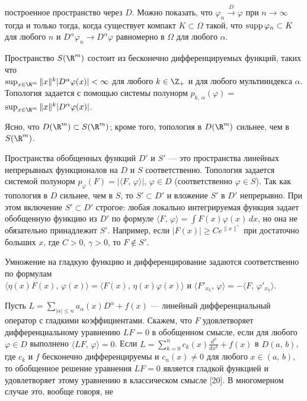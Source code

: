 \documentclass[a4paper
]{article}
\begin{document}
построенное пространство через $D$. Можно показать, что
$\varphi_n\stackrel{D}{\rightarrow}\varphi$ при $n \rightarrow \infty$
тогда и только тогда, когда существует компакт $K\subset \Omega$
такой, что ${\rm supp}\, \varphi_n\subset K$ для любого $n$ и
$D^\alpha \varphi_n\rightarrow D^\alpha\varphi$ равномерно в
$\Omega$ для любого $\alpha$. \par Пространство $S(\R^m)$ состоит
из бесконечно дифференцируемых функций, таких что \\$\sup_{x\in
\R^m}\|x\|^k|D^\alpha \varphi(x)|<\infty$ для любого $k\in \Z_+$ и
для любого мультииндекса $\alpha$. Топология задается с помощью
системы полунорм $p_{k,\, \alpha}(\varphi) = $ $ \sup_{x\in
\R^m}\|x\|^k|D^\alpha \varphi(x)|$. \par Ясно, что $D(\R^m)\subset
S(\R^m)$; кроме того, топология в $D(\R^m)$ сильнее, чем в
$S(\R^m)$. \par Пространства обобщенных функций $D'$ и $S'$ ---
это пространства линейных непрерывных функционалов на $D$ и $S$
соответственно. Топология задается системой полунорм
$p_\varphi(F)=|\langle F, \, \varphi\rangle|$, $\varphi\in D$
(соответственно $\varphi\in S$). Так как топология в $D$ сильнее,
чем в $S$, то $S'\subset D'$ и вложение $S'$ в $D'$ непрерывно. При
этом включение $S'\subset D'$ строгое: любая локально
интегрируемая функция задает обобщенную функцию из $D'$ по формуле
$\langle F, \, \varphi\rangle=\int F(x)\varphi(x)\, dx$, но она не
обязательно принадлежит $S'$. Например, если $|F(x)|\ge
Ce^{\|x\|^\gamma}$ при достаточно больших $x$, где $C>0$,
$\gamma>0$, то $F\notin S'$. \par Умножение на гладкую функцию и
дифференцирование задаются соответственно по формулам \\$\langle
\eta(x)F(x), \, \varphi(x)\rangle=\langle F(x), \,
\eta(x)\varphi(x)\rangle$ и $\langle F'_{x_k}, \, \varphi\rangle=
-\langle F, \, \varphi'_{x_k}\rangle$. \par Пусть $L=\sum
\limits_{|\alpha|\le n}a_{\alpha}(x)D^\alpha+f(x)$ --- линейный
дифференциальный оператор с гладкими коэффициентами. Скажем, что
$F$ удовлетворяет дифференциальному уравнению $LF=0$ в обобщенном
смысле, если для любого $\varphi\in D$ выполнено $\langle LF, \,
\varphi\rangle=0$. Если $L=\sum \limits_{k=0}^n
c_k(x)\frac{d^k}{dx^k}+f(x)$ в $D(a, \, b)$, где $c_k$ и $f$
бесконечно дифференцируемы и $c_n(x)\ne 0$ для любого $x\in (a,
\, b)$, то обобщенное решение уравнения $LF=0$ является гладкой
функцией и удовлетворяет этому уравнению в классическом смысле
[20]. В многомерном случае это, вообще говоря, не
\end{document}
